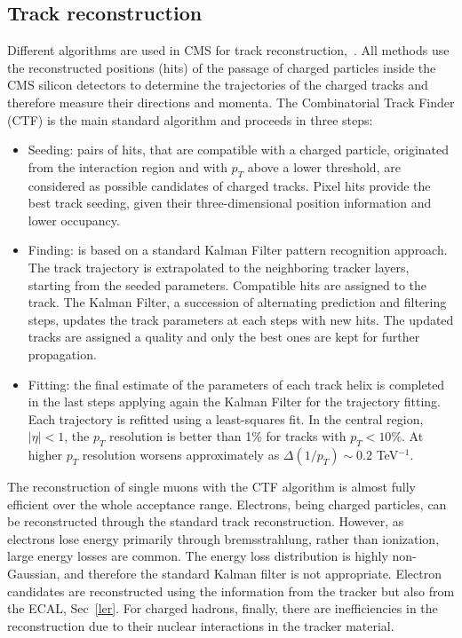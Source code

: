 \subsection*{Track reconstruction}
Different algorithms are used in CMS for track reconstruction,~\cite{Chatrchyan:2014fea, Adam:2005cg}.
All   methods   use   the   reconstructed positions (hits) of the passage of charged
particles inside the CMS silicon detectors to determine the
trajectories of the charged tracks and therefore measure their directions and momenta.  
The Combinatorial Track Finder (CTF) is the main standard algorithm and proceeds in three steps:
\begin{itemize} 
\item Seeding:  pairs of hits, that are compatible with a charged particle, originated from the interaction region and with $p_T$ above a lower
threshold, are considered as possible candidates of
charged tracks.  Pixel hits provide the best track
seeding, given their three-dimensional position information and lower occupancy.  
\item Finding: is based on a standard Kalman  Filter  pattern  recognition  approach.
The  track trajectory  is  extrapolated  to  the  neighboring tracker  layers, starting from the seeded parameters.
Compatible  hits  are  assigned to the track. 
The Kalman Filter, a  succession of  alternating  prediction  and  filtering  steps, 
updates the track parameters at each steps with new hits.
 The updated tracks are assigned a quality and only the best ones are kept for further propagation. 
\item Fitting: the  final  estimate  of  the   parameters  of
each  track  helix  is  completed  in  the  last  steps
applying again the Kalman Filter for the trajectory fitting.  Each trajectory is refitted using a
least-squares fit. In the central region, $|\eta|<1$, the $p_T$ resolution is better than 1\%  for tracks with $p_T<10\%$. At higher $p_T$ resolution worsens approximately as $\Delta (1/p_T) \sim 0.2$ TeV$^{-1}$.
\end{itemize}
The  reconstruction  of  single  muons  with  the
CTF  algorithm  is  almost  fully  efficient  over  the whole acceptance range.
Electrons, being charged particles, can be reconstructed through the standard track reconstruction.  However,  as electrons lose energy primarily through bremsstrahlung,  rather than ionization,  large energy losses are common.  
 The energy loss distribution is highly non-Gaussian, and therefore the standard Kalman filter is not appropriate.
Electron candidates are reconstructed using the  information from the tracker but also from
the ECAL, Sec~\ref{ler}. 
For charged hadrons, finally, there are inefficiencies in the reconstruction due to their nuclear
interactions  in  the  tracker  material. 


